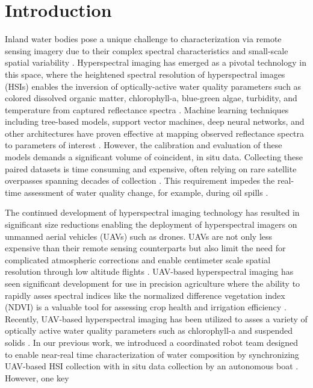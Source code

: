 \documentclass{article}
\begin{document}
\section{Introduction}

Inland water bodies pose a unique challenge to characterization via remote sensing imagery due to their complex spectral characteristics and small-scale spatial variability \cite{koponen2002lake,ritchie2003remote}. Hyperspectral imaging has emerged as a pivotal technology in this space, where the heightened spectral resolution of hyperspectral images (HSIs) enables the inversion of optically-active water quality parameters such as colored dissolved organic matter, chlorophyll-a, blue-green algae, turbidity, and temperature from captured reflectance spectra \cite{brando2003satellite,moses2012estimation}. Machine learning techniques including tree-based models, support vector machines, deep neural networks, and other architectures have proven effective at mapping observed reflectance spectra to parameters of interest \cite{thenkabail2018hyperspectral,keller2018hyperspectral, ghatkar2019classification,sagan2020monitoring}. However, the calibration and evaluation of these models demands a significant volume of coincident, in situ data. Collecting these paired datasets is time consuming and expensive, often relying on rare satellite overpasses spanning decades of collection \cite{aurin2018remote, ross2019aquasat}. This requirement impedes the real-time assessment of water quality change, for example, during oil spills \cite{fingas2014review,fingas2017review}.

The continued development of hyperspectral imaging technology has resulted in significant size reductions enabling the deployment of hyperspectral imagers on unmanned aerial vehicles (UAVs) such as drones. UAVs are not only less expensive than their remote sensing counterparts but also limit the need for complicated atmospheric corrections and enable centimeter scale spatial resolution through low altitude flights \cite{adao2017hyperspectral, arroyo2019implementation, banerjee2020uav}. UAV-based hyperspectral imaging has seen significant development for use in precision agriculture where the ability to rapidly asses spectral indices like the normalized difference vegetation index (NDVI) is a valuable tool for assessing crop health and irrigation efficiency \cite{horstrand2019uav}. Recently, UAV-based hyperspectral imaging has been utilized to asses a variety of optically active water quality parameters such as chlorophyll-a and suspended solids \cite{lu2021retrieval, zhang2022selection}. In our previous work, we introduced a coordinated robot team designed to enable near-real time characterization of water composition by synchronizing UAV-based HSI collection with in situ data collection by an autonomous boat \cite{robot-team-1, robot-team-2}. However, one key 
\end{document}
